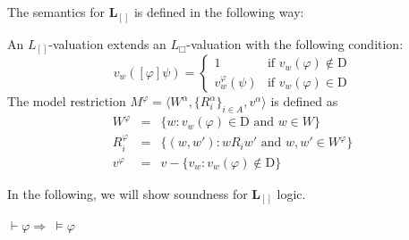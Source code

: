 \documentclass[paper=a4, fontsize=11pt]{scrartcl} %
\numberwithin{equation}{section} %
\numberwithin{figure}{section} %
\numberwithin{table}{section} %
\begin{document}
The semantics for \textbf{L}$_{[]}$ is defined in the following way:
\begin{definition}\label{semantic}
    An $L_{[]}$-valuation extends an $L_\Box$-valuation with the following condition:
   \[
v_w([\varphi]\psi) =
\begin{cases}
1& \text{if } v_w(\varphi) \notin \mathrm{D} \\
v_w^\varphi(\psi) & \text{if } v_w(\varphi) \in \mathrm{D}
\end{cases}
\]
The model restriction $M^\varphi = \langle W^\alpha, \{R_i^\alpha\}_{i \in A}, v^\alpha\rangle$ is defined as
\[\begin{array}{lll}
    W^\varphi& = & \{w: v_w(\varphi) \in \mathrm{D} \text{ and } w \in  W\}\\
     R_i^\varphi & = & \{(w,w'): wR_iw' \text{ and } w, w' \in W^\varphi\}\\
    v^\varphi & = & v - \{v_w:v_w(\varphi) \notin \mathrm{D}\}
\end{array}\]


\end{definition}

In the following, we will show soundness for \textbf{L}$_{[]}$ logic.


\begin{theorem}
    $\vdash \varphi \Rightarrow\ \vDash \varphi$
\end{theorem}
\end{document}
